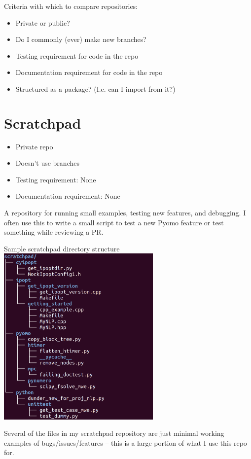\documentclass{article}
\begin{document}
\noindent Criteria with which to compare repositories:
\begin{itemize}
  \item Private or public?
  \item Do I commonly (ever) make new branches?
  \item Testing requirement for code in the repo
  \item Documentation requirement for code in the repo
  \item Structured as a package? (I.e. can I import from it?)
\end{itemize}

\section{Scratchpad}
\begin{itemize}
  \item Private repo
  \item Doesn't use branches
  \item Testing requirement: None
  \item Documentation requirement: None
\end{itemize}
A repository for running small examples, testing new features, and
debugging. I often use this to write a small script to test a new
Pyomo feature or test something while reviewing a PR.

\begin{center}
  \newpage
  Sample scratchpad directory structure\\
  \includegraphics[width=8cm]{scratchpad_tree.png}
\end{center}

Several of the files in my scratchpad repository are just minimal
working examples of bugs/issues/features -- this is a large portion
of what I use this repo for.
\end{document}
